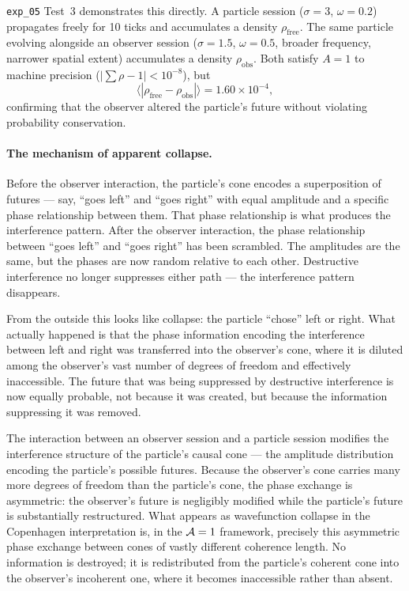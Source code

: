 \texttt{exp\_05} Test~3 demonstrates this directly.  A particle session
($\sigma = 3$, $\omega = 0.2$) propagates freely for 10 ticks and
accumulates a density $\rho_\mathrm{free}$.  The same particle evolving
alongside an observer session ($\sigma = 1.5$, $\omega = 0.5$, broader
frequency, narrower spatial extent) accumulates a density
$\rho_\mathrm{obs}$.  Both satisfy $A = 1$ to machine precision
($|\sum \rho - 1| < 10^{-8}$), but
\[
    \langle |\rho_\mathrm{free} - \rho_\mathrm{obs}| \rangle
    = 1.60 \times 10^{-4},
\]
confirming that the observer altered the particle's future without
violating probability conservation.

\paragraph{The mechanism of apparent collapse.}
Before the observer interaction, the particle's cone encodes a
superposition of futures — say, ``goes left'' and ``goes right'' with
equal amplitude and a specific phase relationship between them.  That
phase relationship is what produces the interference pattern.  After
the observer interaction, the phase relationship between ``goes left''
and ``goes right'' has been scrambled.  The amplitudes are the same,
but the phases are now random relative to each other.  Destructive
interference no longer suppresses either path — the interference
pattern disappears.

From the outside this looks like collapse: the particle ``chose'' left
or right.  What actually happened is that the phase information encoding
the interference between left and right was transferred into the
observer's cone, where it is diluted among the observer's vast number of
degrees of freedom and effectively inaccessible.  The future that was
being suppressed by destructive interference is now equally probable,
not because it was created, but because the information suppressing it
was removed.

The interaction between an observer session and a particle session
modifies the interference structure of the particle's causal cone —
the amplitude distribution encoding the particle's possible futures.
Because the observer's cone carries many more degrees of freedom than
the particle's cone, the phase exchange is asymmetric: the observer's
future is negligibly modified while the particle's future is
substantially restructured.  What appears as wavefunction collapse in
the Copenhagen interpretation is, in the $\mathcal{A}=1$ framework, precisely
this asymmetric phase exchange between cones of vastly different
coherence length.  No information is destroyed; it is redistributed
from the particle's coherent cone into the observer's incoherent one,
where it becomes inaccessible rather than absent.

